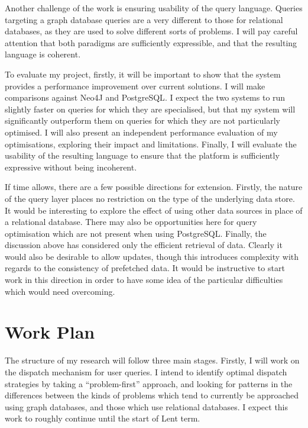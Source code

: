 \documentclass[11pt]{article}
\begin{document}
Another challenge of the work is ensuring usability of the query language. Queries targeting a graph database queries are a very different
to those for relational databases, as they are used to solve different sorts of problems. I will pay careful attention that both paradigms are sufficiently
expressible, and that the resulting language is coherent.

To evaluate my project, firstly, it will be important to show that the system provides a performance improvement
over current solutions. I will make comparisons against Neo4J\cite{neo4j} and PostgreSQL\cite{postgres}. I expect the two systems to run slightly faster on queries for which they are specialised, but that my system will significantly outperform them on queries for which they are not particularly optimised. I will also present an independent performance evaluation of my optimisations,
exploring their impact and limitations. Finally, I will evaluate the usability of the resulting
language to ensure that the platform is sufficiently expressive
without being incoherent.


If time allows, there are a few possible directions for extension. Firstly, 
the nature of the query layer places no restriction on
the type of the underlying data store. It would be interesting to explore the
effect of using other data sources in place of a relational database.
There may also be opportunities here for
query optimisation which are not present when using PostgreSQL. Finally, 
the discussion above has considered only the efficient retrieval of data.
Clearly it would also be desirable to allow updates, though this introduces
complexity with regards to the consistency of prefetched data. It would be
instructive to start work in this direction in order to have some idea of
the particular difficulties which would need overcoming.

\section{Work Plan}

The structure of my research will follow three main stages. Firstly, I will
work on the dispatch mechanism for user queries. I intend to identify optimal
dispatch strategies by taking a ``problem-first'' approach, and looking for
patterns in the differences between the kinds of problems which tend to
currently be approached using graph databases, and those which use relational
databases. I expect this work to roughly continue until the start of Lent
term.
\end{document}
